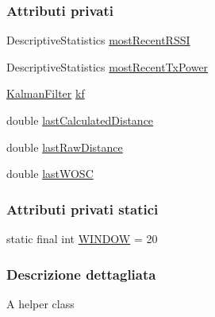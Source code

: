 \subsubsection*{Attributi privati}
\begin{DoxyCompactItemize}
\item 
Descriptive\+Statistics \hyperlink{classit_1_1unibo_1_1torsello_1_1bluetoothpositioning_1_1distanceEstimation_1_1Estimation_a1e9aa70e3f42e2721dc80d9ff512c835_a1e9aa70e3f42e2721dc80d9ff512c835}{most\+Recent\+R\+S\+SI}
\item 
Descriptive\+Statistics \hyperlink{classit_1_1unibo_1_1torsello_1_1bluetoothpositioning_1_1distanceEstimation_1_1Estimation_a20ade9b8868875760a4cfba2474a1e3a_a20ade9b8868875760a4cfba2474a1e3a}{most\+Recent\+Tx\+Power}
\item 
\hyperlink{classit_1_1unibo_1_1torsello_1_1bluetoothpositioning_1_1kalmanFilter_1_1KalmanFilter}{Kalman\+Filter} \hyperlink{classit_1_1unibo_1_1torsello_1_1bluetoothpositioning_1_1distanceEstimation_1_1Estimation_a734998288a044f7642df71cfb24bf734_a734998288a044f7642df71cfb24bf734}{kf}
\item 
double \hyperlink{classit_1_1unibo_1_1torsello_1_1bluetoothpositioning_1_1distanceEstimation_1_1Estimation_a98033672a7c282ab3ada06ada3501f09_a98033672a7c282ab3ada06ada3501f09}{last\+Calculated\+Distance}
\item 
double \hyperlink{classit_1_1unibo_1_1torsello_1_1bluetoothpositioning_1_1distanceEstimation_1_1Estimation_aca258dd3fd097b8ae575725327bb7fad_aca258dd3fd097b8ae575725327bb7fad}{last\+Raw\+Distance}
\item 
double \hyperlink{classit_1_1unibo_1_1torsello_1_1bluetoothpositioning_1_1distanceEstimation_1_1Estimation_aa9f40a7798679556af78132a61149b2a_aa9f40a7798679556af78132a61149b2a}{last\+W\+O\+SC}
\end{DoxyCompactItemize}
\subsubsection*{Attributi privati statici}
\begin{DoxyCompactItemize}
\item 
static final int \hyperlink{classit_1_1unibo_1_1torsello_1_1bluetoothpositioning_1_1distanceEstimation_1_1Estimation_ac683779da2d71df64057d729a8298954_ac683779da2d71df64057d729a8298954}{W\+I\+N\+D\+OW} = 20
\end{DoxyCompactItemize}


\subsubsection{Descrizione dettagliata}
A helper class

